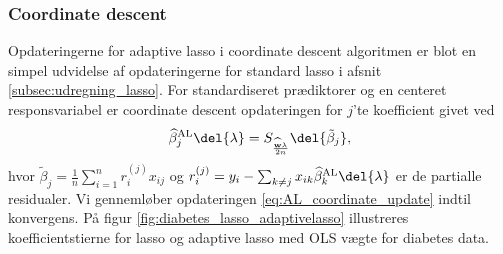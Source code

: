 \subsubsection{Coordinate descent}
Opdateringerne for adaptive lasso i coordinate descent algoritmen er blot en simpel udvidelse af opdateringerne for standard lasso i afsnit \ref{subsec:udregning_lasso}.
For standardiseret prædiktorer og en centeret responsvariabel er coordinate descent opdateringen for $j$'te koefficient givet ved
\begin{align}
\widehat{\beta}^\text{AL}_j \del{\lambda}= S_{\frac{\widehat{\mathbf{w}} \lambda}{2n}} \del{\tilde{\beta}_j}, \label{eq:AL_coordinate_update}
\end{align}
hvor \(\tilde{\beta}_j = \frac{1}{n} \sum_{i=1}^n r_{i}^{(j)} x_{ij}\) og \(r_{i}^{(j)} = y_i - \sum_{k \neq j} x_{ik} \widehat{\beta}^\text{AL}_k \del{\lambda}\) er de partialle residualer.
Vi gennemløber opdateringen \eqref{eq:AL_coordinate_update} indtil konvergens.
%
På figur \ref{fig:diabetes_lasso_adaptivelasso} illustreres koefficientstierne for lasso og adaptive lasso med OLS vægte for diabetes data.

